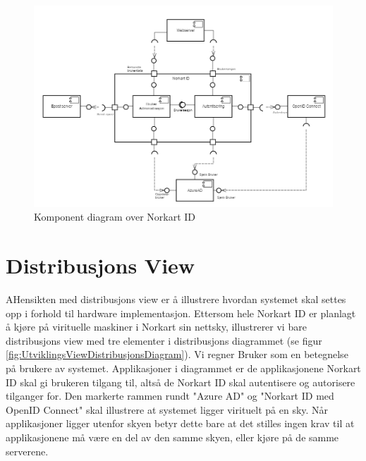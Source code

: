 \begin{figure}[H]
    \centering
    \includegraphics[scale=0.40]{graphics/04-arkitektur/UtviklingsViewKomponentDiagram.png}
    \caption{Komponent diagram over Norkart ID }
    \label{fig:UtviklingsViewKomponentDiagram}
\end{figure}

\section{Distribusjons View}
\label{sec:distribusjons_view}
AHensikten med distribusjons view er å illustrere hvordan systemet skal settes opp i forhold til hardware implementasjon. Ettersom hele Norkart ID er planlagt å kjøre på virituelle maskiner i Norkart sin nettsky, illustrerer vi bare distribusjons view med tre elementer i distribusjons diagrammet (se figur \ref{fig:UtviklingsViewDistribusjonsDiagram}). Vi regner Bruker som en betegnelse på brukere av systemet.  Applikasjoner i diagrammet er de applikasjonene Norkart ID skal gi brukeren tilgang til, altså de Norkart ID skal autentisere og autorisere tilganger for. Den markerte rammen rundt "Azure AD" og "Norkart ID med OpenID Connect" skal illustrere at systemet ligger virituelt på en sky. Når applikasjoner ligger utenfor skyen betyr dette bare at det stilles ingen krav til at applikasjonene må være en del av den samme skyen, eller kjøre på de samme serverene. 

